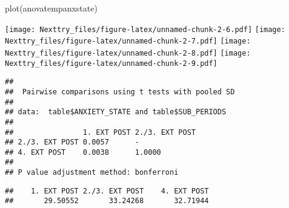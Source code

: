 \documentclass[
]{book}
\newenvironment{Shaded}{\begin{snugshade}}{\end{snugshade}}
\newcommand{\AttributeTok}[1]{\textcolor[rgb]{0.77,0.63,0.00}{#1}}
\newcommand{\CommentTok}[1]{\textcolor[rgb]{0.56,0.35,0.01}{\textit{#1}}}
\newcommand{\ConstantTok}[1]{\textcolor[rgb]{0.00,0.00,0.00}{#1}}
\newcommand{\FunctionTok}[1]{\textcolor[rgb]{0.00,0.00,0.00}{#1}}
\newcommand{\NormalTok}[1]{#1}
\newcommand{\SpecialCharTok}[1]{\textcolor[rgb]{0.00,0.00,0.00}{#1}}
\newcommand{\StringTok}[1]{\textcolor[rgb]{0.31,0.60,0.02}{#1}}
\begin{document}
\begin{Shaded}
\begin{Highlighting}[]
\FunctionTok{plot}\NormalTok{(anovatempanxstate)}
\end{Highlighting}
\end{Shaded}

\texttt{[image: Nexttry\_files/figure-latex/unnamed-chunk-2-6.pdf]} \texttt{[image: Nexttry\_files/figure-latex/unnamed-chunk-2-7.pdf]} \texttt{[image: Nexttry\_files/figure-latex/unnamed-chunk-2-8.pdf]} \texttt{[image: Nexttry\_files/figure-latex/unnamed-chunk-2-9.pdf]}

\begin{Shaded}
\end{Shaded}

\begin{verbatim}
## 
##  Pairwise comparisons using t tests with pooled SD 
## 
## data:  table$ANXIETY_STATE and table$SUB_PERIODS 
## 
##                1. EXT POST 2./3. EXT POST
## 2./3. EXT POST 0.0057      -             
## 4. EXT POST    0.0038      1.0000        
## 
## P value adjustment method: bonferroni
\end{verbatim}

\begin{Shaded}
\end{Shaded}

\begin{verbatim}
##    1. EXT POST 2./3. EXT POST    4. EXT POST 
##       29.50552       33.24268       32.71944
\end{verbatim}
\end{document}
